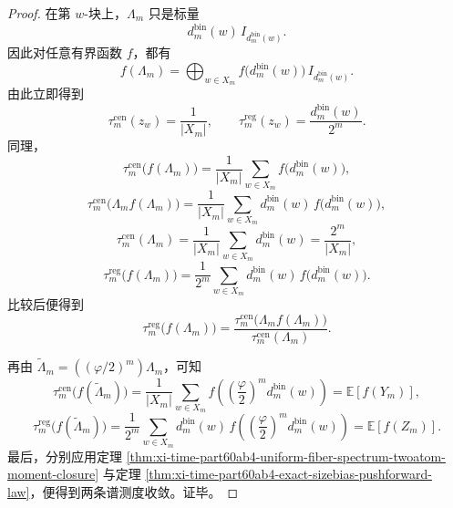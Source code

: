 \begin{proof}
在第 \(w\)-块上，\(\Lambda_m\) 只是标量
\[
d_m^{\mathrm{bin}}(w)\,I_{d_m^{\mathrm{bin}}(w)}.
\]
因此对任意有界函数 \(f\)，都有
\[
f(\Lambda_m)
=
\bigoplus_{w\in X_m}
f\!\bigl(d_m^{\mathrm{bin}}(w)\bigr)\,I_{d_m^{\mathrm{bin}}(w)}.
\]
由此立即得到
\[
\tau_m^{\mathrm{cen}}(z_w)
=
\frac{1}{|X_m|},
\qquad
\tau_m^{\mathrm{reg}}(z_w)
=
\frac{d_m^{\mathrm{bin}}(w)}{2^m}.
\]
同理，
\[
\tau_m^{\mathrm{cen}}\!\bigl(f(\Lambda_m)\bigr)
=
\frac{1}{|X_m|}
\sum_{w\in X_m}
f\!\bigl(d_m^{\mathrm{bin}}(w)\bigr),
\]
\[
\tau_m^{\mathrm{cen}}\!\bigl(\Lambda_m f(\Lambda_m)\bigr)
=
\frac{1}{|X_m|}
\sum_{w\in X_m}
d_m^{\mathrm{bin}}(w)\,
f\!\bigl(d_m^{\mathrm{bin}}(w)\bigr),
\]
\[
\tau_m^{\mathrm{cen}}(\Lambda_m)
=
\frac{1}{|X_m|}
\sum_{w\in X_m}d_m^{\mathrm{bin}}(w)
=
\frac{2^m}{|X_m|},
\]
\[
\tau_m^{\mathrm{reg}}\!\bigl(f(\Lambda_m)\bigr)
=
\frac{1}{2^m}
\sum_{w\in X_m}
d_m^{\mathrm{bin}}(w)\,
f\!\bigl(d_m^{\mathrm{bin}}(w)\bigr).
\]
比较后便得到
\[
\tau_m^{\mathrm{reg}}\!\bigl(f(\Lambda_m)\bigr)
=
\frac{
\tau_m^{\mathrm{cen}}\!\bigl(\Lambda_m f(\Lambda_m)\bigr)
}{
\tau_m^{\mathrm{cen}}(\Lambda_m)
}.
\]

再由 \(\widetilde\Lambda_m=((\varphi/2)^m)\Lambda_m\)，可知
\[
\tau_m^{\mathrm{cen}}\!\bigl(f(\widetilde\Lambda_m)\bigr)
=
\frac{1}{|X_m|}
\sum_{w\in X_m}
f\!\left(\left(\frac{\varphi}{2}\right)^m d_m^{\mathrm{bin}}(w)\right)
=
\mathbb E[f(Y_m)],
\]
\[
\tau_m^{\mathrm{reg}}\!\bigl(f(\widetilde\Lambda_m)\bigr)
=
\frac{1}{2^m}
\sum_{w\in X_m}
d_m^{\mathrm{bin}}(w)\,
f\!\left(\left(\frac{\varphi}{2}\right)^m d_m^{\mathrm{bin}}(w)\right)
=
\mathbb E[f(Z_m)].
\]
最后，分别应用定理 \ref{thm:xi-time-part60ab4-uniform-fiber-spectrum-twoatom-moment-closure} 与定理 \ref{thm:xi-time-part60ab4-exact-sizebias-pushforward-law}，便得到两条谱测度收敛。证毕。
\end{proof}

